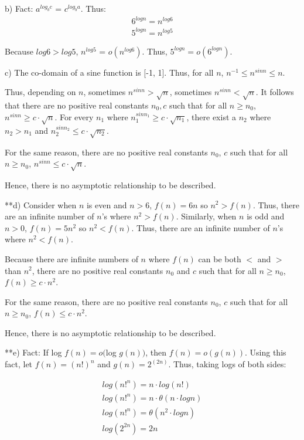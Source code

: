 \documentclass[a4paper]{report}
\begin{document}
\begin{enumerate}
      \bigskip
      b) Fact: $a^{log_{b} c}$ = $c ^ {log_{b} a} $. Thus:
      \begin{align}
        6^{log n} = n^{log 6} \\
        5^{log n} = n^{log 5} 
      \end{align}

      Because $log 6 > log 5$, $n^{log 5}$ = $o(n^{log 6})$. Thus, $5^{log n} = o(6^{log n})$.

      \bigskip
      c) The co-domain of a sine function is [-1, 1]. Thus, for all $n$, $n^{-1} \leq n^{sin n} \leq n$.

      Thus, depending on $n$, sometimes $n^{sin n} > \sqrt{n}$, sometimes $n^{sin n} < \sqrt{n}$.
      It follows that there are no positive real constants $n_{0}, c$ such that for all $n \geq n_{0}$,  $n^{sin n} \geq c \cdot \sqrt{n}$.
      For every $n_{1}$ where $n_{1}^{sin n_{1}} \geq c \cdot \sqrt{n_{1}}$, there exist a $n_{2}$ where $n_{2} > n_{1}$ and $n_{2}^{sin n_{2}} \leq c \cdot \sqrt{n_{2}}$.

      For the same reason, there are no positive real constants $n_{0}$, $c$ such that for all $n \geq n_{0}$, 
      $n^{sin n} \leq c \cdot \sqrt{n}$.

      Hence, there is no asymptotic relationship to be described.

      \bigskip
      **d) 
      Consider when $n$ is even and $n > 6$, $f(n) = 6n$ so $n^2 > f(n)$. Thus, there are an infinite number of $n$'s where $n^2 > f(n)$.
      Similarly, when $n$ is odd and $n > 0$, $f(n) = 5n^2$ so $n^2 < f(n)$. Thus, there are an infinite number of $n$'s where $n^2 < f(n)$. 

      Because there are infinite numbers of $n$ where $f(n)$ can be both $<$ and $>$ than $n^2$, there are no positive real constants $n_{0}$ and $c$ such that 
      for all $n \geq n_{0}$, $f(n) \geq c \cdot n^2$.

      For the same reason, there are no positive real constants $n_{0}$, $c$ such that for all $n \geq n_{0}$, 
      $f(n) \leq c \cdot n^2$.

      Hence, there is no asymptotic relationship to be described.

      \bigskip
      **e) Fact: If log $f(n) = o($log $g(n))$, then $f(n) = o(g(n))$. 
      Using this fact, let $f(n) = (n!)^{n}$ and $g(n) = 2^(2n)$. Thus, taking logs of both sides:

      \begin{align}
        log(n!^{n}) = n \cdot log(n!)\\
        log(n!^{n}) = n \cdot \theta(n \cdot log n)\\
        log(n!^{n}) = \theta(n^2 \cdot log n)\\
        log(2^{2n}) = 2n 
      \end{align}


\end{enumerate}
\end{document}
